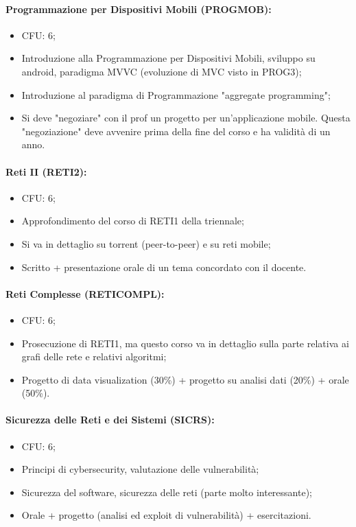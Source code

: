 \paragraph{Programmazione per Dispositivi Mobili (PROGMOB):}

\begin{itemize}
  \item CFU: 6;
  \item Introduzione alla Programmazione per Dispositivi Mobili, sviluppo su android, paradigma MVVC (evoluzione di MVC visto in PROG3);
  \item Introduzione al paradigma di Programmazione "aggregate programming";
  \item Si deve "negoziare" con il prof un progetto per un'applicazione mobile. Questa "negoziazione" deve avvenire prima della fine del corso e ha validità di un anno.
\end{itemize}

\paragraph{Reti II (RETI2):}

\begin{itemize}
  \item CFU: 6;
  \item Approfondimento del corso di RETI1 della triennale;
  \item Si va in dettaglio su torrent (peer-to-peer) e su reti mobile;
  \item Scritto + presentazione orale di un tema concordato con il docente. 
\end{itemize}

\paragraph{Reti Complesse (RETICOMPL):}

\begin{itemize}
  \item CFU: 6;
  \item Prosecuzione di RETI1, ma questo corso va in dettaglio sulla parte relativa ai grafi delle rete e relativi algoritmi;
  \item Progetto di data visualization (30\%) + progetto su analisi dati (20\%) + orale (50\%).
\end{itemize}

\paragraph{Sicurezza delle Reti e dei Sistemi (SICRS):}

\begin{itemize}
  \item CFU: 6;
  \item Principi di cybersecurity, valutazione delle vulnerabilità;
  \item Sicurezza del software, sicurezza delle reti (parte molto interessante);
  \item Orale + progetto (analisi ed exploit di vulnerabilità) + esercitazioni.
\end{itemize}
